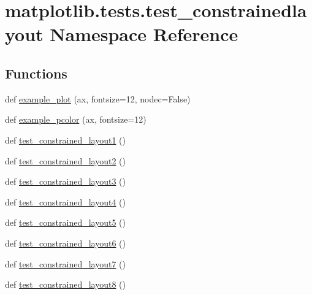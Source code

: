 \hypertarget{namespacematplotlib_1_1tests_1_1test__constrainedlayout}{}\section{matplotlib.\+tests.\+test\+\_\+constrainedlayout Namespace Reference}
\label{namespacematplotlib_1_1tests_1_1test__constrainedlayout}
\subsection*{Functions}
\begin{DoxyCompactItemize}
\item 
def \hyperlink{namespacematplotlib_1_1tests_1_1test__constrainedlayout_abb1a18c784c6cd84dd46474122a04196}{example\+\_\+plot} (ax, fontsize=12, nodec=False)
\item 
def \hyperlink{namespacematplotlib_1_1tests_1_1test__constrainedlayout_a6e4d1131936a5f2803c79031e19ebef9}{example\+\_\+pcolor} (ax, fontsize=12)
\item 
def \hyperlink{namespacematplotlib_1_1tests_1_1test__constrainedlayout_a98f130965b8286af4c980390d03bc5a1}{test\+\_\+constrained\+\_\+layout1} ()
\item 
def \hyperlink{namespacematplotlib_1_1tests_1_1test__constrainedlayout_a09dddafe4d5222a35e557fb18ff35976}{test\+\_\+constrained\+\_\+layout2} ()
\item 
def \hyperlink{namespacematplotlib_1_1tests_1_1test__constrainedlayout_ab330ab6245d11fd05927c631a1ff9d1f}{test\+\_\+constrained\+\_\+layout3} ()
\item 
def \hyperlink{namespacematplotlib_1_1tests_1_1test__constrainedlayout_ab400e86641eafba7ad5cbebe220ad536}{test\+\_\+constrained\+\_\+layout4} ()
\item 
def \hyperlink{namespacematplotlib_1_1tests_1_1test__constrainedlayout_ae39598fda50dbea7905ed93c6bff250d}{test\+\_\+constrained\+\_\+layout5} ()
\item 
def \hyperlink{namespacematplotlib_1_1tests_1_1test__constrainedlayout_a8e23a84dced042f1ba256b1d85032992}{test\+\_\+constrained\+\_\+layout6} ()
\item 
def \hyperlink{namespacematplotlib_1_1tests_1_1test__constrainedlayout_a30cbc4c8c11734731f9caf2948f87f25}{test\+\_\+constrained\+\_\+layout7} ()
\item 
def \hyperlink{namespacematplotlib_1_1tests_1_1test__constrainedlayout_a0060eeef8d0910950df74e024ddd758f}{test\+\_\+constrained\+\_\+layout8} ()

\end{DoxyCompactItemize}
